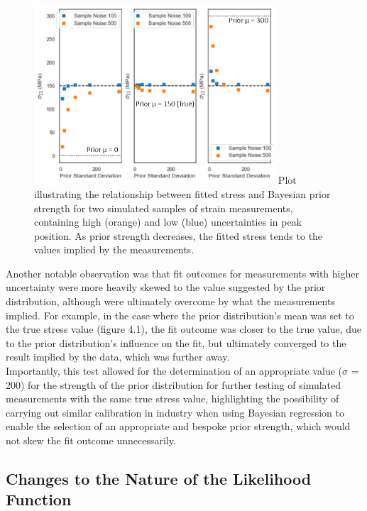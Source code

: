 \begin{figure}[h]
 	\centering
 	\includegraphics[width=0.8\textwidth]{chapters/chapter03/fig03/prior.png}
 	\mycaption
 	{Plot illustrating the relationship between fitted stress and Bayesian prior strength for two simulated samples of strain measurements, containing high (orange) and low (blue) uncertainties in peak position. As prior strength decreases, the fitted stress tends to the values implied by the measurements.}
    \label{fig:RHP02}
 \end{figure}

Another notable observation was that fit outcomes for measurements with higher uncertainty were more heavily skewed to the value suggested by the prior distribution, although were ultimately overcome by what the measurements implied. For example, in the case where the prior distribution's mean was set to the true stress value (figure 4.1), the fit outcome was closer to the true value, due to the prior distribution's influence on the fit, but ultimately converged to the result implied by the data, which was further away. \\

Importantly, this test allowed for the determination of an appropriate value ($\sigma$ = 200) for the strength of the prior distribution for further testing of simulated measurements with the same true stress value, highlighting the possibility of carrying out similar calibration in industry when using Bayesian regression to enable the selection of an appropriate and bespoke prior strength, which would not skew the fit outcome unnecessarily.\\



\subsection{Changes to the Nature of the Likelihood Function}
\label{subsec:subsec01}

